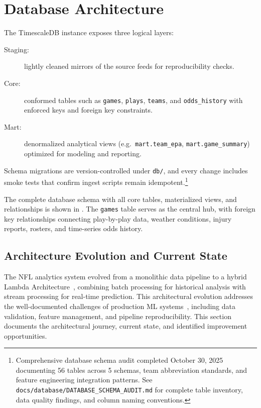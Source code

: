 \section{Database Architecture}\label{sec:schema-mart}
The TimescaleDB instance exposes three logical layers:
\begin{description}
  \item[Staging:] lightly cleaned mirrors of the source feeds for reproducibility checks.
  \item[Core:] conformed tables such as \texttt{games}, \texttt{plays}, \texttt{teams}, and \texttt{odds\_history} with enforced keys and foreign key constraints.
  \item[Mart:] denormalized analytical views (e.g.\ \texttt{mart.team\_epa}, \texttt{mart.game\_summary})\\ optimized for modeling and reporting.
\end{description}
Schema migrations are version-controlled under \texttt{db/}, and every change includes smoke tests that confirm ingest scripts remain idempotent.\footnote{Comprehensive database schema audit completed October 30, 2025 documenting 56 tables across 5 schemas, team abbreviation standards, and feature engineering integration patterns. See \texttt{docs/database/DATABASE\_SCHEMA\_AUDIT.md} for complete table inventory, data quality findings, and column naming conventions.}

The complete database schema with all core tables, materialized views, and relationships is shown in . The \texttt{games} table serves as the central hub, with foreign key relationships connecting play-by-play data, weather conditions, injury reports, rosters, and time-series odds history.



\subsection{Architecture Evolution and Current State}
\label{subsec:architecture_evolution}

The NFL analytics system evolved from a monolithic data pipeline to a hybrid Lambda Architecture~\cite{marz2015big}, combining batch processing for historical analysis with stream processing for real-time prediction. This architectural evolution addresses the well-documented challenges of production ML systems~\cite{sculley2015hidden, polyzotis2017data}, including data validation, feature management, and pipeline reproducibility. This section documents the architectural journey, current state, and identified improvement opportunities.

